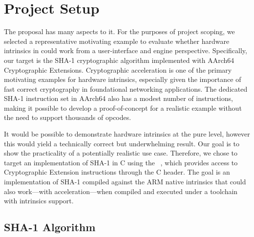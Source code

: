 \section{Project Setup}

The  proposal has many aspects to it. For the purposes
of project scoping, we selected a representative motivating example to evaluate
whether hardware intrinsics in \wasm could work from a user-interface and engine
perspective. Specifically, our target is the SHA-1 cryptographic algorithm
implemented with AArch64 Cryptographic Extensions. Cryptographic acceleration is
one of the primary motivating examples for hardware intrinsics, especially given
the importance of fast correct cryptography in foundational networking
applications. The dedicated SHA-1 instruction set in AArch64 also has a modest
number of instructions, making it possible to develop a proof-of-concept for a
realistic example without the need to support thousands of opcodes.

It would be possible to demonstrate hardware intrinsics at the pure \wasm level,
however this would yield a technically correct but underwhelming result. Our
goal is to show the practicality of a potentially realistic use case.
Therefore, we chose to target an implementation of SHA-1 in C using the
~\cite{acle}, which provides access to Cryptographic Extension
instructions through the  C header. The goal is an
implementation of SHA-1 compiled against the ARM native intrinsics that could
also work---with acceleration---when compiled and executed under a \wasm toolchain
with intrinsics support.

\subsection{SHA-1 Algorithm}

